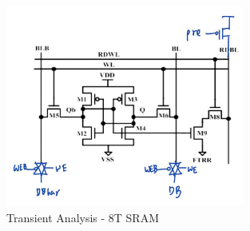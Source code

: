 \documentclass[a4paper]{article}
\begin{document}
\begin{figure}[H]
  \centering
  \includegraphics[width=0.7\textwidth]{./img/2023-11-16-16-28-53.png}
  \caption{Transient Analysis - 8T SRAM}
  \end{figure}
\end{document}
